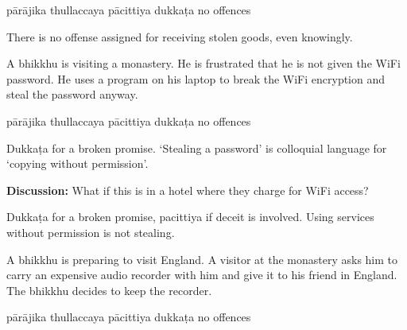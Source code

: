 \begin{exam}{\autoExamName}
\begin{problem*}
\begin{parts}
  \bigskip

  \begin{answers}{5}
    \bChoices
     pārājika\eAns
     thullaccaya\eAns
     pācittiya\eAns
     dukkaṭa\eAns
     no offences\eAns
    \eChoices
  \end{answers}

  \begin{solution}
    There is no offense assigned for receiving stolen goods, even knowingly.
  \end{solution}

  \bigskip

  \item A bhikkhu is visiting a monastery. He is frustrated that he is not given
    the WiFi password. He uses a program on his laptop to break the WiFi encryption
    and steal the password anyway.

  \bigskip

  \begin{answers}{5}
    \bChoices
     pārājika\eAns
     thullaccaya\eAns
     pācittiya\eAns
     dukkaṭa\eAns
     no offences\eAns
    \eChoices
  \end{answers}

  \begin{solution}
    Dukkaṭa for a broken promise. `Stealing a password' is colloquial language
    for `copying without permission'.
  \end{solution}

  \bigskip

  \textbf{Discussion:} What if this is in a hotel where they charge for WiFi access?

  \begin{solution}
    Dukkaṭa for a broken promise, pacittiya if deceit is involved. Using services without permission is not stealing.
  \end{solution}

  \bigskip

  \item A bhikkhu is preparing to visit England. A visitor at the monastery asks
    him to carry an expensive audio recorder with him and give it to his friend in
    England. The bhikkhu decides to keep the recorder.

  \bigskip

  \begin{answers}{5}
    \bChoices
     pārājika\eAns
     thullaccaya\eAns
     pācittiya\eAns
     dukkaṭa\eAns
     no offences\eAns
    \eChoices
  \end{answers}


\end{parts}
\end{problem*}
\end{exam}
